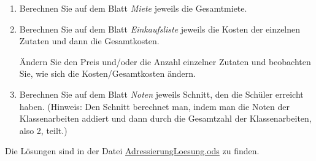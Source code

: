 \begin{Exercise}[title={Öffnen Sie die Datei \href{file:./Uebungsblaetter/Adressierung.ods}{Adressierung.ods}}, label=Kopieren]
    \begin{enumerate}
        \item Berechnen Sie auf dem Blatt \textit{Miete} jeweils die Gesamtmiete.
        \item Berechnen Sie auf dem Blatt \textit{Einkaufsliste} jeweils die Kosten der einzelnen Zutaten und dann die Gesamtkosten.

        Ändern Sie den Preis und/oder die Anzahl einzelner Zutaten und beobachten Sie, wie sich die Kosten/Gesamtkosten ändern.
        \item Berechnen Sie auf dem Blatt \textit{Noten} jeweils Schnitt, den die Schüler erreicht haben. (Hinweis: Den Schnitt berechnet man, indem man die Noten der Klassenarbeiten addiert und dann durch die Gesamtzahl der Klassenarbeiten, also 2, teilt.)
    \end{enumerate}
\end{Exercise}
\begin{Answer}[ref=Kopieren]
    Die Lösungen sind in der Datei \href{file:./Uebungsblaetter/AdressierungLoesung.ods}{AdressierungLoesung.ods} zu finden.
\end{Answer}